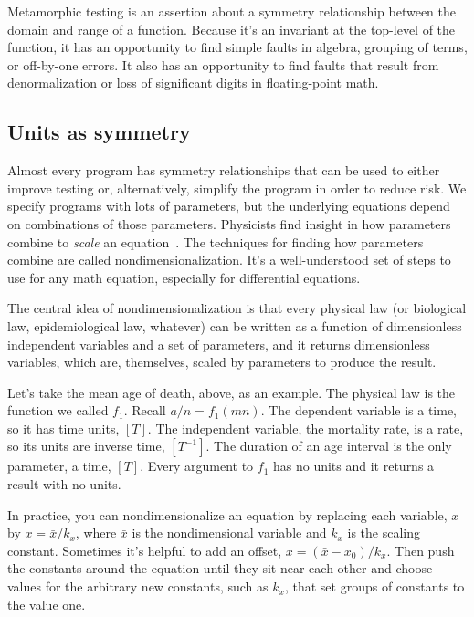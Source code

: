 \documentclass[fleqn,10pt]{olplainarticle}
\begin{document}
Metamorphic testing is an assertion about a symmetry relationship between
the domain and range of a function. Because it's an invariant at the top-level
of the function, it has an opportunity to find simple faults in algebra,
grouping of terms, or off-by-one errors. It also has an opportunity to
find faults that result from denormalization or loss of significant digits
in floating-point math.


\subsection{Units as symmetry}

Almost every program has symmetry relationships that can be used
to either improve testing or, alternatively, simplify the program in
order to reduce risk. We specify programs with lots of parameters,
but the underlying equations depend on combinations of those
parameters. Physicists find insight in how parameters combine
to \emph{scale} an equation~\citep{barenblatt1996}.
The techniques for finding how parameters combine are called
nondimensionalization. It's a
well-understood set of steps to use for any math equation, especially
for differential equations.

The central idea of nondimensionalization is that every physical
law (or biological law, epidemiological law, whatever) can be
written as a function of dimensionless independent variables
and a set of parameters, and it returns dimensionless variables,
which are, themselves, scaled by parameters to produce the result.

Let's take the mean age of death, above, as an example.
The physical law is the function we called $f_1$.
Recall $a/n = f_1(mn)$.
The dependent variable is a time, so it has time units, $[T]$.
The independent variable, the mortality rate, is a rate,
so its units are inverse time, $[T^{-1}]$.
The duration of an age interval is the only parameter, a time, $[T]$.
Every argument to $f_1$ has no units and it returns a result with no units.

In practice, you can nondimensionalize an equation by replacing
each variable, $x$ by $x=\bar{x}/k_x$, where $\bar{x}$ is the
nondimensional variable and $k_x$ is the scaling constant. Sometimes
it's helpful to add an offset, $x=(\bar{x} - x_0)/k_x$. Then
push the constants around the equation until they sit near each
other and choose values for the arbitrary new constants, such as $k_x$,
that set groups of constants to the value one.
\end{document}
